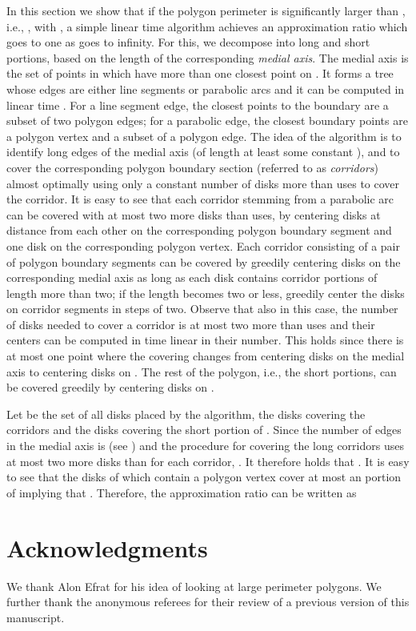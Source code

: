 \documentclass{llncs}
\begin{document}
In this section we show that if the polygon perimeter  is significantly larger than , i.e., , with , a simple linear time algorithm achieves an approximation ratio which goes to one as  goes to infinity. For this, we decompose  into long and short portions, based on the length of the corresponding \emph{medial axis}. The medial axis is the set of points in  which have more than one closest point on . It forms a tree whose edges are either line segments or parabolic arcs and it can be computed in linear time \cite{medialAxis}. For a line segment edge, the closest points to the boundary are a subset of two polygon edges; for a parabolic edge, the closest boundary points are a polygon vertex and a subset of a polygon edge.  The idea of the algorithm is to identify long edges of the medial axis (of length at least some constant ), and to cover the corresponding polygon boundary section (referred to as {\em corridors}) almost optimally using only a constant number of disks more than  uses to cover the corridor. It is easy to see that each corridor stemming from a parabolic arc can be covered with at most two more disks than  uses, by centering disks at distance  from each other on the corresponding polygon boundary segment and one disk on the corresponding polygon vertex.  Each corridor consisting of a pair of polygon boundary segments can be covered by greedily centering disks on the corresponding medial axis as long as each disk contains corridor portions of length more than two; if the length becomes two or less, greedily center the disks on  corridor segments in steps of two.  Observe that also in this case, the number of disks needed to cover a corridor is at most two more than  uses and their centers can be computed in time linear in their number. This holds since there is at most one point where the covering changes from centering disks on the medial axis to centering disks on . The rest of the polygon, i.e., the short portions,  can be covered greedily by centering  disks on .

Let  be the set of all disks placed by the algorithm,  the disks covering the corridors and  the  disks covering the short portion of .  
Since the number of edges in the medial axis is  (see \cite{medialAxis}) and the procedure for covering the long corridors uses at most two more disks than  for each corridor, . It therefore holds that . It is easy to see that the disks of  which contain a polygon vertex cover at most an  portion of  implying that .  Therefore, the approximation ratio can be written as
 






\section{Acknowledgments}
\vspace{-8pt}
We thank Alon Efrat for his idea of looking at large perimeter polygons. We further thank the anonymous referees for their review of a previous version of this manuscript.

\vspace{-8pt}

	
\end{document}
